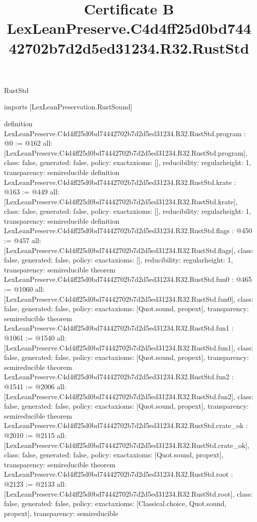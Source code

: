 \begin{lexlean}{RustStd}
\title{Certificate B LexLeanPreserve.C4d4ff25d0bd74442702b7d2d5ed31234.R32.RustStd}
\begin{coremodule}
imports [LexLeanPreservation.RustSound]

definition LexLeanPreserve.C4d4ff25d0bd74442702b7d2d5ed31234.R32.RustStd.program : @0 := @162 {
  all: [LexLeanPreserve.C4d4ff25d0bd74442702b7d2d5ed31234.R32.RustStd.program],
  class: false,
  generated: false,
  policy: exact{axioms: []},
  reducibility: regular{height: 1},
  transparency: semireducible
}
definition LexLeanPreserve.C4d4ff25d0bd74442702b7d2d5ed31234.R32.RustStd.krate : @163 := @449 {
  all: [LexLeanPreserve.C4d4ff25d0bd74442702b7d2d5ed31234.R32.RustStd.krate],
  class: false,
  generated: false,
  policy: exact{axioms: []},
  reducibility: regular{height: 1},
  transparency: semireducible
}
definition LexLeanPreserve.C4d4ff25d0bd74442702b7d2d5ed31234.R32.RustStd.flags : @450 := @457 {
  all: [LexLeanPreserve.C4d4ff25d0bd74442702b7d2d5ed31234.R32.RustStd.flags],
  class: false,
  generated: false,
  policy: exact{axioms: []},
  reducibility: regular{height: 1},
  transparency: semireducible
}
theorem LexLeanPreserve.C4d4ff25d0bd74442702b7d2d5ed31234.R32.RustStd.fun0 : @465 := @1060 {
  all: [LexLeanPreserve.C4d4ff25d0bd74442702b7d2d5ed31234.R32.RustStd.fun0],
  class: false,
  generated: false,
  policy: exact{axioms: [Quot.sound, propext]},
  transparency: semireducible
}
theorem LexLeanPreserve.C4d4ff25d0bd74442702b7d2d5ed31234.R32.RustStd.fun1 : @1061 := @1540 {
  all: [LexLeanPreserve.C4d4ff25d0bd74442702b7d2d5ed31234.R32.RustStd.fun1],
  class: false,
  generated: false,
  policy: exact{axioms: [Quot.sound, propext]},
  transparency: semireducible
}
theorem LexLeanPreserve.C4d4ff25d0bd74442702b7d2d5ed31234.R32.RustStd.fun2 : @1541 := @2006 {
  all: [LexLeanPreserve.C4d4ff25d0bd74442702b7d2d5ed31234.R32.RustStd.fun2],
  class: false,
  generated: false,
  policy: exact{axioms: [Quot.sound, propext]},
  transparency: semireducible
}
theorem LexLeanPreserve.C4d4ff25d0bd74442702b7d2d5ed31234.R32.RustStd.crate_ok : @2010 := @2115 {
  all: [LexLeanPreserve.C4d4ff25d0bd74442702b7d2d5ed31234.R32.RustStd.crate_ok],
  class: false,
  generated: false,
  policy: exact{axioms: [Quot.sound, propext]},
  transparency: semireducible
}
theorem LexLeanPreserve.C4d4ff25d0bd74442702b7d2d5ed31234.R32.RustStd.root : @2123 := @2133 {
  all: [LexLeanPreserve.C4d4ff25d0bd74442702b7d2d5ed31234.R32.RustStd.root],
  class: false,
  generated: false,
  policy: exact{axioms: [Classical.choice, Quot.sound, propext]},
  transparency: semireducible
}


\end{coremodule}
\end{lexlean}

